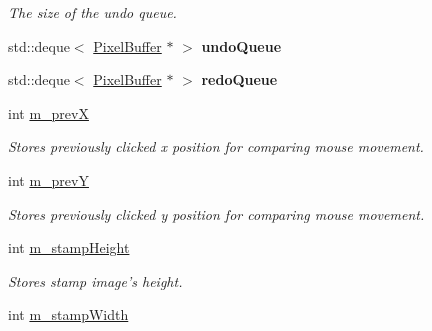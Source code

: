 \begin{DoxyCompactItemize}
{{\begin{DoxyCompactList}\small\item\em The size of the undo queue. \end{DoxyCompactList}\item 
\hypertarget{classFlashPhotoApp_abdb0f4d46432039c14d5816abb019fa7}{std\-::deque$<$ \hyperlink{classPixelBuffer}{Pixel\-Buffer} $\ast$ $>$ {\bfseries undo\-Queue}}\label{classFlashPhotoApp_abdb0f4d46432039c14d5816abb019fa7}

\item 
\hypertarget{classFlashPhotoApp_a67142e2e575f5c63666b3e750279fd4f}{std\-::deque$<$ \hyperlink{classPixelBuffer}{Pixel\-Buffer} $\ast$ $>$ {\bfseries redo\-Queue}}\label{classFlashPhotoApp_a67142e2e575f5c63666b3e750279fd4f}

\item 
\hypertarget{classFlashPhotoApp_a7552f6cf6441c53d020e5a0124031bcb}{int \hyperlink{classFlashPhotoApp_a7552f6cf6441c53d020e5a0124031bcb}{m\-\_\-prev\-X}}\label{classFlashPhotoApp_a7552f6cf6441c53d020e5a0124031bcb}

\begin{DoxyCompactList}\small\item\em Stores previously clicked x position for comparing mouse movement. \end{DoxyCompactList}\item 
\hypertarget{classFlashPhotoApp_a6a9759bdfbdf16bf0091f1694604a64a}{int \hyperlink{classFlashPhotoApp_a6a9759bdfbdf16bf0091f1694604a64a}{m\-\_\-prev\-Y}}\label{classFlashPhotoApp_a6a9759bdfbdf16bf0091f1694604a64a}

\begin{DoxyCompactList}\small\item\em Stores previously clicked y position for comparing mouse movement. \end{DoxyCompactList}\item 
\hypertarget{classFlashPhotoApp_a2e397b37bfb3ea981efc795b7a2a9e9e}{int \hyperlink{classFlashPhotoApp_a2e397b37bfb3ea981efc795b7a2a9e9e}{m\-\_\-stamp\-Height}}\label{classFlashPhotoApp_a2e397b37bfb3ea981efc795b7a2a9e9e}

\begin{DoxyCompactList}\small\item\em Stores stamp image's height. \end{DoxyCompactList}\item 
\hypertarget{classFlashPhotoApp_a7dab8bf3eb60e4c99310660c9c32f3a5}{int \hyperlink{classFlashPhotoApp_a7dab8bf3eb60e4c99310660c9c32f3a5}{m\-\_\-stamp\-Width}}\label{classFlashPhotoApp_a7dab8bf3eb60e4c99310660c9c32f3a5}

}}
\end{DoxyCompactItemize}
